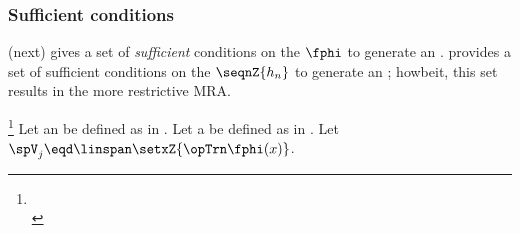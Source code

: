 \subsubsection{Sufficient conditions}
 (next) gives a set of \emph{sufficient} conditions on the   
$\fphi$ to generate an .
 provides a set of sufficient conditions on the   $\seqnZ{h_n}$ 
to generate an ; howbeit, this set results in the more restrictive  MRA.
\begin{theorem}
\footnote{
  \\
  }
\label{thm:mra_rdc}
\label{thm:mra_sufficient_phi}
Let an  be defined as in .
Let a  be defined as in .
Let $\spV_j\eqd\linspan\setxZ{\opTrn\fphi(x)}$.
\end{theorem}

